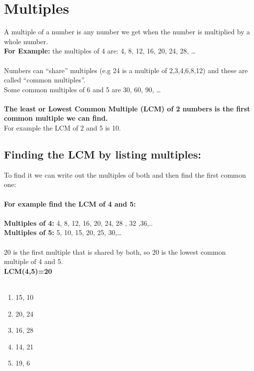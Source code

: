 \documentclass[a4paper,12pt]{article}
\begin{document}
\section{Multiples}
A multiple of a number is any number we get when the number is multiplied by a whole number.\\
\textbf{For Example:}
the multiples of 4 are: 4, 8, 12, 16, 20, 24, 28, …\\\\
Numbers can “share” multiples  (e.g 24 is a multiple of 2,3,4,6,8,12) and these are called “common multiples”.\\
Some common multiples of 6 and 5 are 30, 60, 90, …\\\\
\textbf{The least or Lowest Common Multiple (LCM) of 2 numbers is the first common multiple we can find.}\\
For example the LCM of 2 and 5 is 10.
\subsection{Finding the LCM by listing multiples:}
To find it we can write out the multiples of both and then find the first common one:\\\\
\textbf{For example find the LCM of 4 and 5:}\\\\
\textbf{Multiples of 4: }  4,  8, 12, 16,  20,  24, 28 , 32 ,36,..\\
\textbf{Multiples of 5: }  5, 10,  15, 20, 25, 30,…\\\\
20 is the first multiple that is shared by both, so 20 is the lowest common multiple of 4 and 5.\\
\textbf{LCM(4,5)=20}\\\\
\begin{tcolorbox}[colback=red!0!white, colframe=gray ,title=\subsubsection{Find the LCM of:}\label{LCM}]
\begin{multicols}{5}
	\begin{enumerate}[label= \roman*)]
		\item 15, 10   
		\item 20, 24   
		\item 16, 28
		\item 14, 21
		\item 19, 6
	\end{enumerate}
\end{multicols}
\end{tcolorbox}\vspace{0.25cm}
\end{document}
